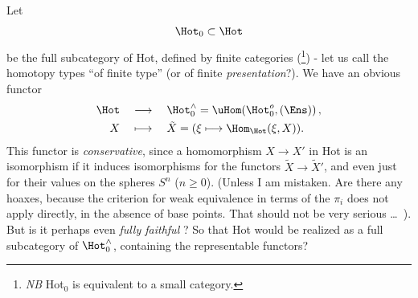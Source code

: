 Let
\[
\Hot_0 \subset \Hot
\]
be the full subcategory of Hot, defined by finite categories (\footnote[9]{\textit{NB} Hot$_0$ is equivalent to a small category.}) - let us call the homotopy types ``of finite type'' (or of finite \textit{presentation}?). We have an obvious functor
\[
\begin{aligned}
\Hot \quad &\longrightarrow \quad \Hot_0^{\wedge} = \uHom(\Hot_0^{o}, (\Ens)) \, ,\\
X \quad &\longmapsto \quad \tilde{X} = (\xi \longmapsto \Hom_{\Hot}(\xi, X)).
\end{aligned}
\]
This functor is \textit{conservative}, since a homomorphism $X \longrightarrow X'$ in Hot is an isomorphism if it induces isomorphisms for the functors $\tilde{X} \longrightarrow \tilde{X}'$, and even just for their values on the spheres $S^n$ ($n \geq 0$). (Unless I am mistaken. Are there any hoaxes, because the criterion for weak equivalence in terms of the $\pi_i$ does not apply directly, in the absence of base points. That should not be very serious \ldots\ ). But is it perhaps even \textit{fully faithful} ? So that Hot would be realized as a full subcategory of $\Hot_0^{\wedge}$, containing the representable functors?